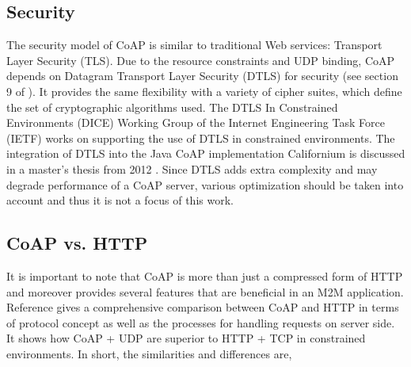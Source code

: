 \subsection{Security}\label{security}

The security model of CoAP is similar to traditional Web services: Transport Layer Security (TLS). Due to the resource constraints and UDP binding, CoAP depends on Datagram Transport Layer Security (DTLS) for security (see section 9 of \cite{coap_protocol}). It provides the same flexibility with a variety of cipher suites, which define the set of cryptographic algorithms used. The DTLS In Constrained Environments (DICE) Working Group of the Internet Engineering Task Force (IETF) works on supporting the use of DTLS in constrained environments.  The integration of DTLS into the Java CoAP implementation Californium \cite{californium} is discussed in a master's thesis from 2012 \cite{jucker2012securing}. Since DTLS adds extra complexity and may degrade performance of a CoAP server, various optimization should be taken into account and thus it is not a focus of this work.

\subsection{CoAP vs. HTTP}\label{vs_HTTP}

It is important to note that CoAP is more than just a compressed form of HTTP and moreover provides several features that are beneficial in an M2M application. Reference \cite{lanter2013scalability} gives a comprehensive comparison between CoAP and HTTP in terms of protocol concept as well as the processes for handling requests on server side. It shows how CoAP + UDP are superior to HTTP + TCP in constrained environments. In short, the similarities and differences are,

